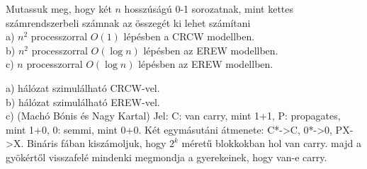 \begin{Exercise}[counter={sorszam}, difficulty=0]
	Mutassuk meg, hogy két $n$ hosszúságú 0-1 sorozatnak, mint kettes számrendszerbeli számnak az összegét ki lehet számítani\\
	a) $n^2$ processzorral $O(1)$ lépésben a CRCW modellben.\\
	b) $n^2$ processzorral $O(\log n)$ lépésben az EREW modellben.\\
	c) $n$ processzorral $O(\log n)$ lépésben az EREW modellben.
\end{Exercise}	
\begin{Answer}
	a) \ACnull h\'al\'ozat szimul\'alhat\'o CRCW-vel.\\
	b) \NCone h\'al\'ozat szimul\'alhat\'o EREW-vel.\\
	c) (Mach\'o B\'onis \'es Nagy Kartal) Jel: C: van carry, mint 1+1, P: propagates, mint 1+0, 0: semmi, mint 0+0. K\'et egym\'asut\'ani \'atmenete: C*->C, 0*->0, PX->X. Bin\'aris f\'aban kisz\'amoljuk, hogy $2^k$ m\'eret\H u blokkokban hol van carry. majd a gy\"ok\'ert\H ol visszafel\'e mindenki megmondja a gyerekeinek, hogy van-e carry.
\end{Answer}
%

